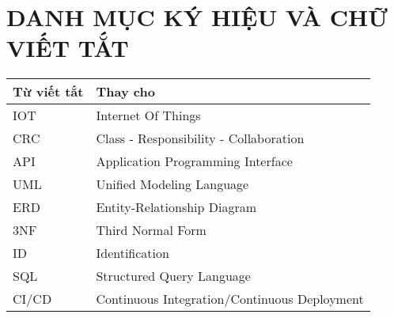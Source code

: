


\clearpage
\pagestyle{empty} %
{}
\tableofcontents %

\clearpage
\pagestyle{plain} %

\cleardoublepage

\section*{DANH MỤC KÝ HIỆU VÀ CHỮ VIẾT TẮT}%

\begin{table}[H]
	\centering
	\begin{tabularx}{0.85\textwidth}{
		| >{\centering\arraybackslash}m{3cm}
		| >{\centering\arraybackslash}X|
		}
		\hline
		\bfseries Từ viết tắt & \bfseries Thay cho\hspace{1cm}               \\ \hline
        IOT                   & Internet Of Things                           \\ \hline
		CRC                   & Class - Responsibility - Collaboration       \\ \hline
		API                   & Application Programming Interface            \\ \hline
		UML                   & Unified Modeling Language                    \\ \hline
		ERD                   & Entity-Relationship Diagram                  \\ \hline
		3NF                   & Third Normal Form                            \\ \hline
		ID                    & Identification                               \\ \hline
		SQL                   & Structured Query Language                    \\ \hline
		CI/CD                 & Continuous Integration/Continuous Deployment \\ \hline
	\end{tabularx}
\end{table}
\cleardoublepage

{
	\let\oldnumberline\numberline
	\renewcommand{\numberline}{\figurename~\oldnumberline}%
	\listoffigures
} %
\cleardoublepage

{
	\let\oldnumberline\numberline
	\renewcommand{\numberline}{\tablename~\oldnumberline}%
	\listoftables
} %
\cleardoublepage
